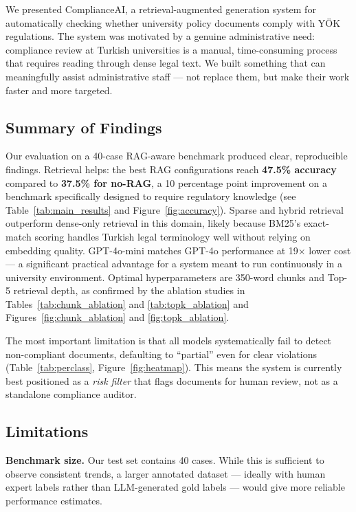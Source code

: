 We presented ComplianceAI, a retrieval-augmented generation system for
automatically checking whether university policy documents comply with YÖK
regulations. The system was motivated by a genuine administrative need:
compliance review at Turkish universities is a manual, time-consuming process
that requires reading through dense legal text.
We built something that can meaningfully assist administrative staff ---
not replace them, but make their work faster and more targeted.

\subsection{Summary of Findings}

Our evaluation on a 40-case RAG-aware benchmark produced clear,
reproducible findings.
Retrieval helps: the best RAG configurations reach \textbf{47.5\% accuracy}
compared to \textbf{37.5\% for no-RAG}, a 10 percentage point improvement
on a benchmark specifically designed to require regulatory knowledge
(see Table~\ref{tab:main_results} and Figure~\ref{fig:accuracy}).
Sparse and hybrid retrieval outperform dense-only retrieval in this domain,
likely because BM25's exact-match scoring handles Turkish legal terminology
well without relying on embedding quality.
GPT-4o-mini matches GPT-4o performance at 19$\times$ lower cost ---
a significant practical advantage for a system meant to run continuously
in a university environment.
Optimal hyperparameters are 350-word chunks and Top-5 retrieval depth,
as confirmed by the ablation studies in
Tables~\ref{tab:chunk_ablation} and \ref{tab:topk_ablation} and
Figures~\ref{fig:chunk_ablation} and \ref{fig:topk_ablation}.

The most important limitation is that all models systematically fail to
detect non-compliant documents, defaulting to ``partial'' even for clear
violations (Table~\ref{tab:perclass}, Figure~\ref{fig:heatmap}).
This means the system is currently best positioned as a \textit{risk filter}
that flags documents for human review, not as a standalone compliance auditor.

\subsection{Limitations}

\textbf{Benchmark size.}
Our test set contains 40 cases. While this is sufficient to observe
consistent trends, a larger annotated dataset --- ideally with human expert
labels rather than LLM-generated gold labels --- would give more reliable
performance estimates.

